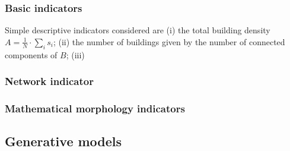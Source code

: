 \documentclass[letterpaper]{article}
\begin{document}
\subsubsection{Basic indicators}
Simple descriptive indicators considered are (i) the total building density $A = \frac{1}{N}\cdot \sum_i s_i$; (ii) the number of buildings given by the number of connected components of $B$; (iii) 


\subsubsection{Network indicator}


\subsubsection{Mathematical morphology indicators}













\subsection{Generative models}
\end{document}
